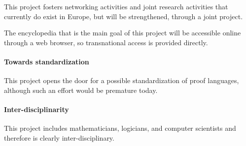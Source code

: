 This project fosters networking activities and joint research
activities that currently do exist in Europe, but will be
strengthened, through a joint project.

The encyclopedia that is the main goal of this project will be
accessible online through a web browser, so transnational access is
provided directly.

\paragraph{Towards standardization}
This project opens the door for a possible standardization of proof
languages, although such an effort would be premature today.

\paragraph{Inter-disciplinarity}
This project includes mathematicians, logicians, and computer
scientists and therefore is clearly inter-disciplinary.

 
